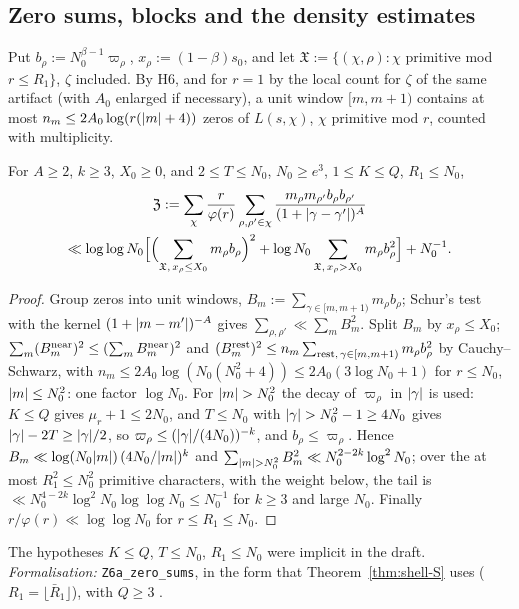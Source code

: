 \subsection{Zero sums, blocks and the density estimates}\label{ssec:shell-density}
Put $b_\rho:=N_0^{\beta-1}\varpi_\rho$, $x_\rho:=(1-\beta)s_0$, and let $\mathfrak X:=\{(\chi,\rho):\chi$ primitive mod $r\le R_1\}$, $\zeta$ included. By H6, and for $r=1$ by the local count for $\zeta$ of the same artifact (with $A_0$ enlarged if necessary), a unit window $[m,m+1)$
contains at most $n_m\le2A_0\log(r(\lvert m\rvert+4))$ zeros of $L(s,\chi)$, $\chi$ primitive mod $r$, counted with multiplicity.

\begin{lemma}\label{lem:shell-6a}
For $A\ge2$, $k\ge3$, $X_0\ge0$, and $2\le T\le N_0$, $N_0\ge e^3$, $1\le K\le Q$, $R_1\le N_0$,
\begin{multline*}
\mathfrak Z:=\sum_\chi\frac r{\varphi(r)}\sum_{\rho,\rho'\in\chi}\frac{m_\rho m_{\rho'}b_\rho b_{\rho'}}{(1+\lvert \gamma-\gamma'\rvert)^A}\\
\ll\log\log N_0\Bigl[\Bigl(\sum_{\mathfrak X,\,x_\rho\le X_0}m_\rho b_\rho\Bigr)^2+\log N_0\sum_{\mathfrak X,\,x_\rho>X_0}m_\rho b_\rho^2\Bigr]+N_0^{-1}.
\end{multline*}
\end{lemma}
\begin{proof}
Group zeros into unit windows, $B_m:=\sum_{\gamma\in[m,m+1)}m_\rho b_\rho$; Schur's test with the kernel $(1+\lvert m-m'\rvert)^{-A}$ gives $\sum_{\rho,\rho'}\ll\sum_mB_m^2$. Split
$B_m$ by $x_\rho\le X_0$; $\sum_m(B^{\rm near}_m)^2\le(\sum_mB^{\rm near}_m)^2$ and $(B^{\rm rest}_m)^2\le n_m\sum_{{\rm rest},\,\gamma\in[m,m+1)}m_\rho b_\rho^2$ by Cauchy--Schwarz, with
$n_m\le2A_0\log(N_0(N_0^2+4))\le2A_0(3\log N_0+1)$ for $r\le N_0$, $\lvert m\rvert\le N_0^2$: one factor $\log N_0$. For $\lvert m\rvert>N_0^2$ the decay of $\varpi_\rho$ in $\lvert \gamma\rvert$
is used: $K\le Q$ gives $\mu_r+1\le2N_0$, and $T\le N_0$ with $\lvert \gamma\rvert>N_0^2-1\ge4N_0$ gives $\lvert \gamma\rvert-2T\ge\lvert \gamma\rvert/2$, so $\varpi_\rho\le(\lvert \gamma\rvert/(4N_0))^{-k}$,
and $b_\rho\le\varpi_\rho$. Hence $B_m\ll\log(N_0\lvert m\rvert)\,(4N_0/\lvert m\rvert)^k$ and $\sum_{\lvert m\rvert>N_0^2}B_m^2\ll N_0^{2-2k}\log^2N_0$; over the at most $R_1^2\le N_0^2$
primitive characters, with the weight below, the tail is $\ll N_0^{4-2k}\log^2N_0\log\log N_0\le N_0^{-1}$ for $k\ge3$ and large $N_0$. Finally
$r/\varphi(r)\ll\log\log N_0$ for $r\le R_1\le N_0$.
\end{proof}
The hypotheses $K\le Q$, $T\le N_0$, $R_1\le N_0$ were implicit in the draft. \emph{Formalisation:} \texttt{Z6a\_zero\_sums}, in the form that
Theorem~\ref{thm:shell-S} uses ($R_1=\lfloor\bar R_1\rfloor$), with $Q\ge3$ \tagL.

